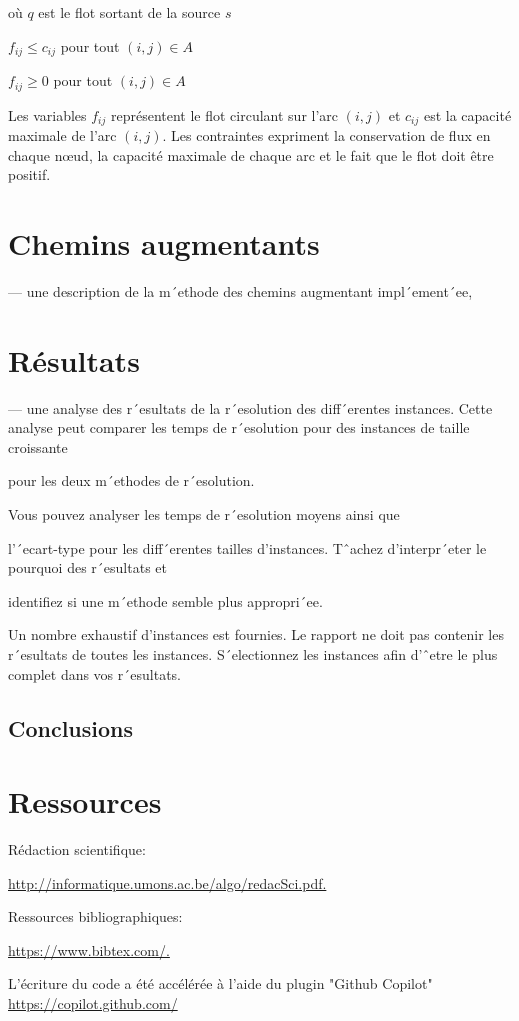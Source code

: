 \documentclass{article}
\begin{document}
où $q$ est le flot sortant de la source $s$

$f_{ij} \leq c_{ij}$ pour tout $(i,j) \in A$

$f_{ij} \geq 0$ pour tout $(i,j) \in A$

Les variables $f_{ij}$ représentent le flot circulant sur l'arc $(i,j)$
    et $c_{ij}$ est la capacité maximale de l'arc $(i,j)$.
    Les contraintes expriment
    la conservation de flux en chaque nœud,
    la capacité maximale de chaque arc
    et le fait que le flot doit être positif.

   \section{Chemins augmentants}

— une description de la m´ethode des chemins augmentant impl´ement´ee,




   \section{Résultats}
— une analyse des r´esultats de la r´esolution des diff´erentes instances.
   Cette analyse peut comparer les
temps de r´esolution
   pour des instances de taille croissante

   pour les deux m´ethodes de r´esolution.

Vous pouvez analyser
   les temps de r´esolution moyens ainsi que

   l’´ecart-type pour les diff´erentes tailles
d’instances.
   Tˆachez d’interpr´eter le pourquoi des r´esultats et

   identifiez si une m´ethode semble plus
appropri´ee.

Un nombre exhaustif d’instances est fournies. Le rapport ne doit pas contenir les r´esultats de toutes
les instances. S´electionnez les instances afin d’ˆetre le plus complet dans vos r´esultats.






    \newpage

    \subsection{Conclusions }



    \newpage



    \section{Ressources}
    Rédaction scientifique:

    \href{http://informatique.umons.ac.be/algo/redacSci.pdf.}{http://informatique.umons.ac.be/algo/redacSci.pdf.
    }

    Ressources bibliographiques:

    \href{https://www.bibtex.com/.}{https://www.bibtex.com/.}

    L'écriture du code a été accélérée à l'aide du plugin "Github Copilot"
    \href{https://copilot.github.com/}{https://copilot.github.com/}
\end{document}
